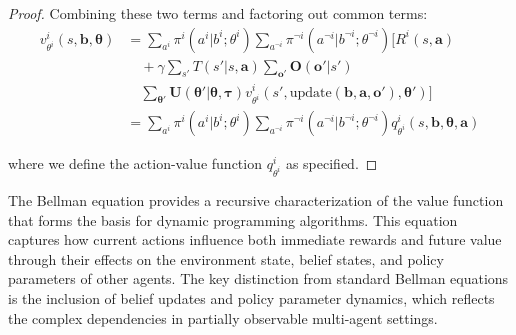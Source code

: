 \documentclass[a4paper,12pt]{report}
\begin{document}
\begin{proof}
    Combining these two terms and factoring out common terms:
    \begin{align}
        v^{i}_{\theta^i}(s, \boldsymbol{b}, \boldsymbol{\theta}) & = \sum_{a^i}\pi^{i}(a^{i}|b^{i}; \theta^{i}) \sum_{a^{\neg i}}\pi^{\neg i}(a^{\neg i}|b^{\neg i}; \theta^{\neg i}) \Bigg[ R^{i}(s, \boldsymbol{a}) \nonumber                                                                   \\
                                                                 & \quad + \gamma \sum_{s'}T(s'|s, \boldsymbol{a}) \sum_{\boldsymbol{o}'}\boldsymbol{O}(\boldsymbol{o}'|s') \nonumber                                                                                                             \\
                                                                 & \quad \sum_{\boldsymbol{\theta}'}\boldsymbol{U}(\boldsymbol{\theta}'|\boldsymbol{\theta}, \boldsymbol{\tau}) v^{i}_{\theta^i}(s', \text{update}(\boldsymbol{b}, \boldsymbol{a}, \boldsymbol{o}'), \boldsymbol{\theta}') \Bigg] \\
                                                                 & = \sum_{a^i}\pi^{i}(a^{i}|b^{i}; \theta^{i}) \sum_{a^{\neg i}}\pi^{\neg i}(a^{\neg i}|b^{\neg i}; \theta^{\neg i}) q^{i}_{\theta^i}(s, \boldsymbol{b}, \boldsymbol{\theta}, \boldsymbol{a})
    \end{align}

    where we define the action-value function $q^{i}_{\theta^i}$ as specified.
\end{proof}The Bellman equation provides a recursive characterization of the
value function that forms the basis for dynamic programming algorithms. This equation
captures how current actions influence both immediate rewards and future value through
their effects on the environment state, belief states, and policy parameters of other
agents. The key distinction from standard Bellman equations is the inclusion of
belief updates and policy parameter dynamics, which reflects the complex dependencies
in partially observable multi-agent settings.
\end{document}
